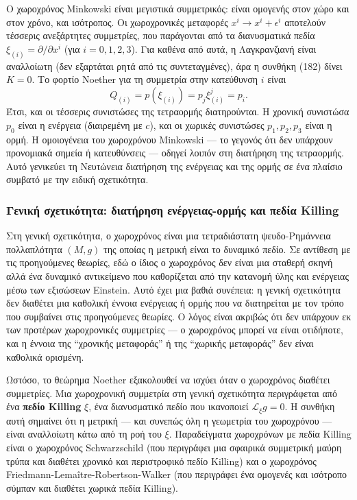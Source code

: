 \documentclass[12pt]{article}
\begin{document}
Ο χωροχρόνος Minkowski είναι μεγιστικά συμμετρικός: είναι ομογενής στον χώρο και στον χρόνο, και ισότροπος. Οι χωροχρονικές μεταφορές $x^i \to x^i + \epsilon^i$ αποτελούν τέσσερις ανεξάρτητες συμμετρίες, που παράγονται από τα διανυσματικά πεδία $\xi_{(i)} = \partial / \partial x^i$ (για $i = 0, 1, 2, 3$). Για καθένα από αυτά, η Λαγκρανζιανή είναι αναλλοίωτη (δεν εξαρτάται ρητά από τις συντεταγμένες), άρα η συνθήκη (182) δίνει $K = 0$. Το φορτίο Noether για τη συμμετρία στην κατεύθυνση $i$ είναι
\[
Q_{(i)} = p(\xi_{(i)}) = p_j \xi_{(i)}^j = p_i.
\]
Έτσι, και οι τέσσερις συνιστώσες της τετραορμής διατηρούνται. Η χρονική συνιστώσα $p_0$ είναι η ενέργεια (διαιρεμένη με $c$), και οι χωρικές συνιστώσες $p_1, p_2, p_3$ είναι η ορμή. Η ομοιογένεια του χωροχρόνου Minkowski — το γεγονός ότι δεν υπάρχουν προνομιακά σημεία ή κατευθύνσεις — οδηγεί λοιπόν στη διατήρηση της τετραορμής. Αυτό γενικεύει τη Νευτώνεια διατήρηση της ενέργειας και της ορμής σε ένα πλαίσιο συμβατό με την ειδική σχετικότητα.

\subsubsection{Γενική σχετικότητα: διατήρηση ενέργειας-ορμής και πεδία Killing}

Στη γενική σχετικότητα, ο χωροχρόνος είναι μια τετραδιάστατη ψευδο-Ρημάννεια πολλαπλότητα $(M, g)$ της οποίας η μετρική είναι το δυναμικό πεδίο. Σε αντίθεση με τις προηγούμενες θεωρίες, εδώ ο ίδιος ο χωροχρόνος δεν είναι μια σταθερή σκηνή αλλά ένα δυναμικό αντικείμενο που καθορίζεται από την κατανομή ύλης και ενέργειας μέσω των εξισώσεων Einstein. Αυτό έχει μια βαθιά συνέπεια: η γενική σχετικότητα δεν διαθέτει μια καθολική έννοια ενέργειας ή ορμής που να διατηρείται με τον τρόπο που συμβαίνει στις προηγούμενες θεωρίες. Ο λόγος είναι ακριβώς ότι δεν υπάρχουν εκ των προτέρων χωροχρονικές συμμετρίες — ο χωροχρόνος μπορεί να είναι οτιδήποτε, και η έννοια της ``χρονικής μεταφοράς'' ή της ``χωρικής μεταφοράς'' δεν είναι καθολικά ορισμένη.

Ωστόσο, το θεώρημα Noether εξακολουθεί να ισχύει όταν ο χωροχρόνος διαθέτει συμμετρίες. Μια χωροχρονική συμμετρία στη γενική σχετικότητα περιγράφεται από ένα \textbf{πεδίο Killing} $\xi$, ένα διανυσματικό πεδίο που ικανοποιεί $\mathcal{L}_\xi g = 0$. Η συνθήκη αυτή σημαίνει ότι η μετρική — και συνεπώς όλη η γεωμετρία του χωροχρόνου — είναι αναλλοίωτη κάτω από τη ροή του $\xi$. Παραδείγματα χωροχρόνων με πεδία Killing είναι ο χωροχρόνος Schwarzschild (που περιγράφει μια σφαιρικά συμμετρική μαύρη τρύπα και διαθέτει χρονικό και περιστροφικό πεδίο Killing) και ο χωροχρόνος Friedmann-Lemaître-Robertson-Walker (που περιγράφει ένα ομογενές και ισότροπο σύμπαν και διαθέτει χωρικά πεδία Killing).
\end{document}
